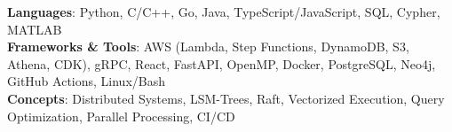 \begin{itemize}[leftmargin=0.15in, label={}]
  \small{\item{
    \textbf{Languages}{: Python, C/C++, Go, Java, TypeScript/JavaScript, SQL, Cypher, MATLAB} \\
    \textbf{Frameworks \& Tools}: AWS (Lambda, Step Functions, DynamoDB, S3, Athena, CDK), gRPC, React, FastAPI, OpenMP, Docker, PostgreSQL, Neo4j, GitHub Actions, Linux/Bash} \\
    \textbf{Concepts}{: Distributed Systems, LSM-Trees, Raft, Vectorized Execution, Query Optimization, Parallel Processing, CI/CD}
  }
\end{itemize}